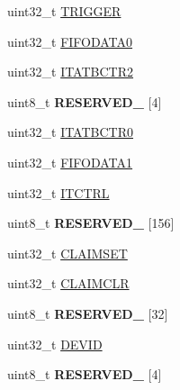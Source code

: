 \begin{DoxyCompactItemize}
\item 
uint32\+\_\+t \hyperlink{struct_t_p_i_u___mem_map_a267271b4e2d7ad48cba1614440c741fb}{T\+R\+I\+G\+G\+E\+R}
\item 
uint32\+\_\+t \hyperlink{struct_t_p_i_u___mem_map_abb1cb9e6415fb7a020856a400197b7bf}{F\+I\+F\+O\+D\+A\+T\+A0}
\item 
uint32\+\_\+t \hyperlink{struct_t_p_i_u___mem_map_a1f6d13a29acd05c39533ebb6616cc67a}{I\+T\+A\+T\+B\+C\+T\+R2}
\item 
\hypertarget{struct_t_p_i_u___mem_map_a65a20e11a4607dc2dea6225c53dcabfd}{}uint8\+\_\+t {\bfseries R\+E\+S\+E\+R\+V\+E\+D\+\_} \mbox{[}4\mbox{]}\label{struct_t_p_i_u___mem_map_a65a20e11a4607dc2dea6225c53dcabfd}

\item 
uint32\+\_\+t \hyperlink{struct_t_p_i_u___mem_map_a1b09ee3aba38ca90fb73747e55d0f775}{I\+T\+A\+T\+B\+C\+T\+R0}
\item 
uint32\+\_\+t \hyperlink{struct_t_p_i_u___mem_map_a49b8e093cff84e13fc33a98587395a39}{F\+I\+F\+O\+D\+A\+T\+A1}
\item 
uint32\+\_\+t \hyperlink{struct_t_p_i_u___mem_map_ac4619f833066fb015a2ff4679fd50fb5}{I\+T\+C\+T\+R\+L}
\item 
\hypertarget{struct_t_p_i_u___mem_map_a0aa85a9c5ed85a0099e24d99526186b3}{}uint8\+\_\+t {\bfseries R\+E\+S\+E\+R\+V\+E\+D\+\_} \mbox{[}156\mbox{]}\label{struct_t_p_i_u___mem_map_a0aa85a9c5ed85a0099e24d99526186b3}

\item 
uint32\+\_\+t \hyperlink{struct_t_p_i_u___mem_map_a70bd66aa2144dae3d99cda444fe4110d}{C\+L\+A\+I\+M\+S\+E\+T}
\item 
uint32\+\_\+t \hyperlink{struct_t_p_i_u___mem_map_a01f1e255c3a45165fab0992c2db91029}{C\+L\+A\+I\+M\+C\+L\+R}
\item 
\hypertarget{struct_t_p_i_u___mem_map_a594cc6c2774df8a9d4575d7cb3657dd3}{}uint8\+\_\+t {\bfseries R\+E\+S\+E\+R\+V\+E\+D\+\_} \mbox{[}32\mbox{]}\label{struct_t_p_i_u___mem_map_a594cc6c2774df8a9d4575d7cb3657dd3}

\item 
uint32\+\_\+t \hyperlink{struct_t_p_i_u___mem_map_a31752201ff5297f2a82d228387b252c1}{D\+E\+V\+I\+D}
\item 
\hypertarget{struct_t_p_i_u___mem_map_a76b3719cc3c928e534a794be0a0351a1}{}uint8\+\_\+t {\bfseries R\+E\+S\+E\+R\+V\+E\+D\+\_} \mbox{[}4\mbox{]}\label{struct_t_p_i_u___mem_map_a76b3719cc3c928e534a794be0a0351a1}


\end{DoxyCompactItemize}
